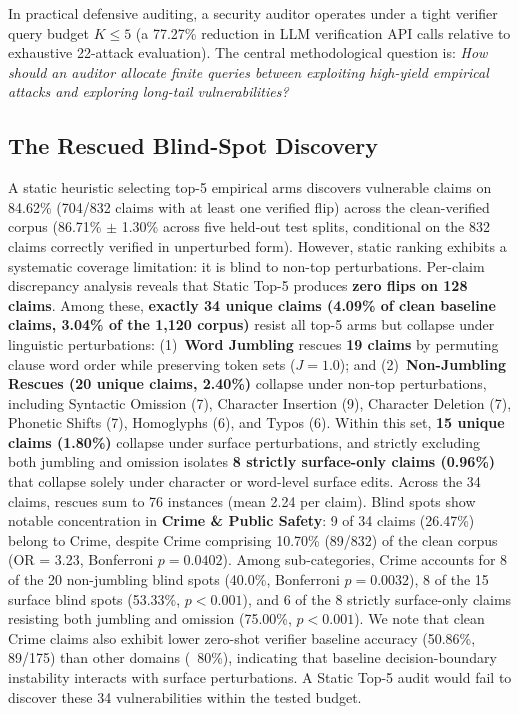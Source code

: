 \documentclass[11pt]{article}
\begin{document}
In practical defensive auditing, a security auditor operates under a tight verifier query budget $K \le 5$ (a 77.27\% reduction in LLM verification API calls relative to exhaustive 22-attack evaluation). The central methodological question is: \emph{How should an auditor allocate finite queries between exploiting high-yield empirical attacks and exploring long-tail vulnerabilities?}

\subsection{The Rescued Blind-Spot Discovery}
A static heuristic selecting top-5 empirical arms discovers vulnerable claims on 84.62\% (704/832 claims with at least one verified flip) across the clean-verified corpus (86.71\% $\pm$ 1.30\% across five held-out test splits, conditional on the 832 claims correctly verified in unperturbed form). However, static ranking exhibits a systematic coverage limitation: it is blind to non-top perturbations. Per-claim discrepancy analysis reveals that Static Top-5 produces \textbf{zero flips on 128 claims}. Among these, \textbf{exactly 34 unique claims (4.09\% of clean baseline claims, 3.04\% of the 1,120 corpus)} resist all top-5 arms but collapse under linguistic perturbations: (1)~\textbf{Word Jumbling} rescues \textbf{19 claims} by permuting clause word order while preserving token sets ($J=1.0$); and (2)~\textbf{Non-Jumbling Rescues (20 unique claims, 2.40\%)} collapse under non-top perturbations, including Syntactic Omission (7), Character Insertion (9), Character Deletion (7), Phonetic Shifts (7), Homoglyphs (6), and Typos (6). Within this set, \textbf{15 unique claims (1.80\%)} collapse under surface perturbations, and strictly excluding both jumbling and omission isolates \textbf{8 strictly surface-only claims (0.96\%)} that collapse solely under character or word-level surface edits. Across the 34 claims, rescues sum to 76 instances (mean 2.24 per claim). Blind spots show notable concentration in \textbf{Crime \& Public Safety}: 9 of 34 claims (26.47\%) belong to Crime, despite Crime comprising 10.70\% (89/832) of the clean corpus (OR = 3.23, Bonferroni $p = 0.0402$). Among sub-categories, Crime accounts for 8 of the 20 non-jumbling blind spots (40.0\%, Bonferroni $p=0.0032$), 8 of the 15 surface blind spots (53.33\%, $p < 0.001$), and 6 of the 8 strictly surface-only claims resisting both jumbling and omission (75.00\%, $p < 0.001$). We note that clean Crime claims also exhibit lower zero-shot verifier baseline accuracy (50.86\%, 89/175) than other domains (~80\%), indicating that baseline decision-boundary instability interacts with surface perturbations. A Static Top-5 audit would fail to discover these 34 vulnerabilities within the tested budget.
\end{document}
